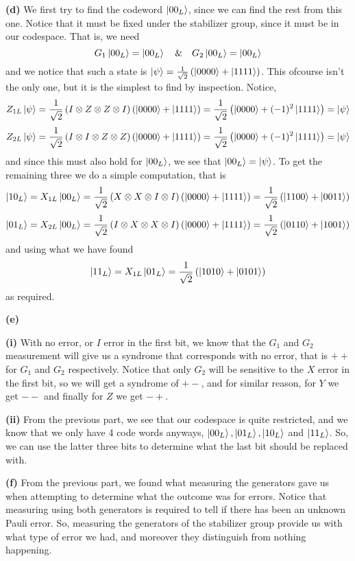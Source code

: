 \documentclass[10pt]{article}
\begin{document}
\textbf{(d)} We first try to find the codeword $\ket{00_{L}}$, since we can find the rest from this one. Notice that it must be fixed under the stabilizer group, since it must be in our codespace. That is, we need
\[ G_{1}\ket{00_{L}} = \ket{00_{L}} \quad \& \quad G_{2}\ket{00_{L}} = \ket{00_{L}} \]
and we notice that such a state is $\ket{\psi} = \frac{1}{\sqrt{2}}\left(\ket{0000} + \ket{1111}\right)$. This ofcourse isn't the only one, but it is the simplest to find by inspection. Notice,
\[ Z_{1L}\ket{\psi} = \frac{1}{\sqrt{2}}\left(I \otimes Z\otimes Z\otimes I\right)\left(\ket{0000} + \ket{1111}\right) = \frac{1}{\sqrt{2}}\left(\ket{0000} + (-1)^{2}\ket{1111}\right) = \ket{\psi} \]
\[ Z_{2L}\ket{\psi} = \frac{1}{\sqrt{2}}\left(I \otimes I\otimes Z\otimes Z\right)\left(\ket{0000} + \ket{1111}\right) = \frac{1}{\sqrt{2}}\left(\ket{0000} + (-1)^{2}\ket{1111}\right) = \ket{\psi} \]
and since this must also hold for $\ket{00_{L}}$, we see that $\ket{00_{L}} = \ket{\psi}$. To get the remaining three we do a simple computation, that is
\[ \ket{10_{L}} = X_{1L}\ket{00_{L}} = \frac{1}{\sqrt{2}}\left(X\otimes X\otimes I \otimes I\right)\left(\ket{0000} + \ket{1111} \right) = \frac{1}{\sqrt{2}}\left(\ket{1100} + \ket{0011}\right) \]
\[ \ket{01_{L}} = X_{2L}\ket{00_{L}} = \frac{1}{\sqrt{2}}\left(I\otimes X\otimes X \otimes I\right)\left(\ket{0000} + \ket{1111} \right) = \frac{1}{\sqrt{2}}\left(\ket{0110} + \ket{1001}\right) \]
and using what we have found
\[ \ket{11_{L}} = X_{1L}\ket{01_{L}} = \frac{1}{\sqrt{2}}\left(\ket{1010} + \ket{0101}\right) \]
as required.

\textbf{(e)}

\textbf{(i)} With no error, or $I$ error in the first bit, we know that the $G_{1}$ and $G_{2}$ measurement will give us a syndrome that corresponds with no error, that is $++$ for $G_{1}$ and $G_{2}$ respectively. Notice that only $G_{2}$ will be sensitive to the $X$ error in the first bit, so we will get a syndrome of $+-$, and for similar reason, for $Y$ we get $--$ and finally for $Z$ we get $-+$.

\textbf{(ii)} From the previous part, we see that our codespace is quite restricted, and we know that we only have 4 code words anyways, $\ket{00_{L}},\ket{01_{L}},\ket{10_{L}}$ and $\ket{11_{L}}$. So, we can use the latter three bits to determine what the last bit should be replaced with.

\textbf{(f)} From the previous part, we found what measuring the generators gave us when attempting to determine what the outcome was for errors. Notice that measuring using both generators is required to tell if there has been an unknown Pauli error. So, measuring the generators of the stabilizer group provide us with what type of error we had, and moreover they distinguish from nothing happening. 
\end{document}

